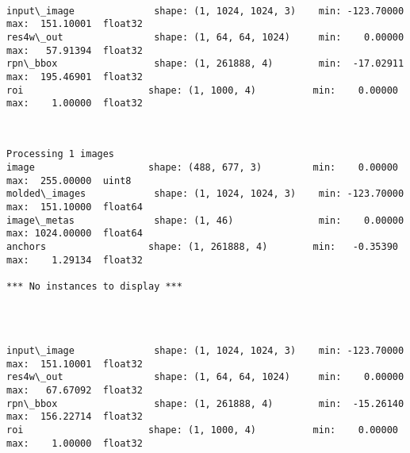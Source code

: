 \documentclass[11pt]{article}
\begin{document}
    \begin{center}
    \end{center}
    { \hspace*{\fill} \\}
    
    \begin{Verbatim}[commandchars=\\\{\}]
input\_image              shape: (1, 1024, 1024, 3)    min: -123.70000  max:  151.10001  float32
res4w\_out                shape: (1, 64, 64, 1024)     min:    0.00000  max:   57.91394  float32
rpn\_bbox                 shape: (1, 261888, 4)        min:  -17.02911  max:  195.46901  float32
roi                      shape: (1, 1000, 4)          min:    0.00000  max:    1.00000  float32

    \end{Verbatim}

    \begin{center}
    \end{center}
    { \hspace*{\fill} \\}
    
    \begin{Verbatim}[commandchars=\\\{\}]
Processing 1 images
image                    shape: (488, 677, 3)         min:    0.00000  max:  255.00000  uint8
molded\_images            shape: (1, 1024, 1024, 3)    min: -123.70000  max:  151.10000  float64
image\_metas              shape: (1, 46)               min:    0.00000  max: 1024.00000  float64
anchors                  shape: (1, 261888, 4)        min:   -0.35390  max:    1.29134  float32

*** No instances to display *** 


    \end{Verbatim}

    \begin{center}
    \end{center}
    { \hspace*{\fill} \\}
    
    \begin{Verbatim}[commandchars=\\\{\}]
input\_image              shape: (1, 1024, 1024, 3)    min: -123.70000  max:  151.10001  float32
res4w\_out                shape: (1, 64, 64, 1024)     min:    0.00000  max:   67.67092  float32
rpn\_bbox                 shape: (1, 261888, 4)        min:  -15.26140  max:  156.22714  float32
roi                      shape: (1, 1000, 4)          min:    0.00000  max:    1.00000  float32

    \end{Verbatim}
\end{document}
